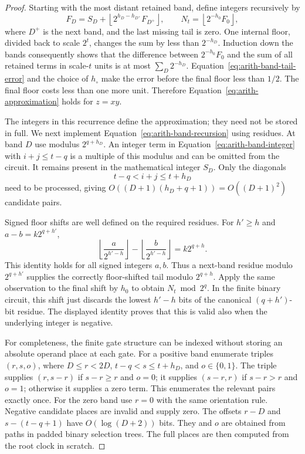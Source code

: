 \begin{proof}
Starting with the most distant retained band, define integers
recursively by
\begin{equation}
 F_D=S_D+
       \left\lfloor 2^{h_D-h_{D^+}}F_{D^+}\right\rfloor,
 \qquad
 N_t=\left\lfloor2^{-h_0}F_0\right\rfloor,
 \label{eq:arith-band-recursion}
\end{equation}
where $D^+$ is the next band, and the last missing tail is zero.
One internal floor, divided back to scale $2^t$, changes the sum
by less than $2^{-h_D}$.  Induction down the bands consequently
shows that the difference between $2^{-h_0}F_0$ and the sum of
all retained terms in scale-$t$ units is at most $\sum_D2^{-h_D}$.
Equation~\eqref{eq:arith-band-tail-error} and the choice of
$h_\circ$ make the error before the final floor less than $1/2$.
The final floor costs less than one more unit.  Therefore
Equation~\eqref{eq:arith-approximation} holds for $z=xy$.

The integers in this recurrence define the approximation; they need not be stored in full. We next implement Equation~\eqref{eq:arith-band-recursion} using residues.  At band $D$ use modulus $2^{q+h_D}$.  An integer term
in Equation~\eqref{eq:arith-band-integer} with $i+j\leq t-q$
is a multiple of this modulus and can be omitted from the circuit.
It remains present in the mathematical integer $S_D$.
Only the diagonals
\begin{equation}
 t-q<i+j\leq t+h_D
 \label{eq:arith-relevant-diagonals}
\end{equation}
need to be processed, giving
$O((D+1)(h_D+q+1))=O((D+1)^2)$ candidate pairs.

Signed floor shifts are well defined on the required residues.
For $h'\geq h$ and $a-b=k2^{q+h'}$,
\begin{equation}
 \left\lfloor\frac{a}{2^{h'-h}}\right\rfloor
 -\left\lfloor\frac{b}{2^{h'-h}}\right\rfloor
       =k2^{q+h}.
 \label{eq:arith-signed-residue-floor}
\end{equation}
This identity holds for all signed integers $a,b$.  Thus a next-band
residue modulo $2^{q+h'}$ supplies the correctly floor-shifted
tail modulo $2^{q+h}$.  Apply the same observation to the final
shift by $h_0$ to obtain $N_t\bmod2^q$.
In the finite binary circuit, this shift just discards the lowest
$h'-h$ bits of the canonical $(q+h')$-bit residue.  The displayed
identity proves that this is valid also when the underlying integer
is negative.

For completeness, the finite gate structure can be indexed without
storing an absolute operand place at each gate.  For a positive
band enumerate triples $(r,s,o)$, where
$D\leq r<2D$, $t-q<s\leq t+h_D$, and $o\in\{0,1\}$.
The triple supplies $(r,s-r)$ if $s-r\geq r$ and $o=0$;
it supplies $(s-r,r)$ if $s-r>r$ and $o=1$; otherwise it supplies
a zero term.  This enumerates the relevant pairs exactly once.
For the zero band use $r=0$ with the same orientation rule.
Negative candidate places are invalid and supply zero.
The offsets $r-D$ and $s-(t-q+1)$ have $O(\log(D+2))$ bits.
They and $o$ are obtained from paths in padded binary selection trees.
The full places are then computed from the root clock in scratch.


\end{proof}
